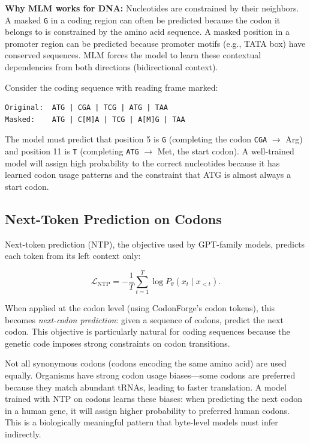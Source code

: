 \textbf{Why MLM works for DNA:} Nucleotides are constrained by their neighbors. A masked \texttt{G} in a coding region can often be predicted because the codon it belongs to is constrained by the amino acid sequence. A masked position in a promoter region can be predicted because promoter motifs (e.g., TATA box) have conserved sequences. MLM forces the model to learn these contextual dependencies from both directions (bidirectional context).

\begin{example}
Consider the coding sequence with reading frame marked:

\begin{verbatim}
Original:  ATG | CGA | TCG | ATG | TAA
Masked:    ATG | C[M]A | TCG | A[M]G | TAA
\end{verbatim}

\noindent
The model must predict that position 5 is \texttt{G} (completing the codon \texttt{CGA} $\to$ Arg) and position 11 is \texttt{T} (completing \texttt{ATG} $\to$ Met, the start codon). A well-trained model will assign high probability to the correct nucleotides because it has learned codon usage patterns and the constraint that ATG is almost always a start codon.
\end{example}

\subsection{Next-Token Prediction on Codons}

Next-token prediction (NTP), the objective used by GPT-family models, predicts each token from its left context only:

\begin{equation}
\mathcal{L}_{\mathrm{NTP}} = -\frac{1}{T} \sum_{t=1}^{T} \log P_\theta(x_t \mid x_{<t}).
\label{eq:ntp-codon}
\end{equation}

When applied at the codon level (using CodonForge's codon tokens), this becomes \emph{next-codon prediction}: given a sequence of codons, predict the next codon. This objective is particularly natural for coding sequences because the genetic code imposes strong constraints on codon transitions.

\begin{bioinsight}
Not all synonymous codons (codons encoding the same amino acid) are used equally. Organisms have strong codon usage biases---some codons are preferred because they match abundant tRNAs, leading to faster translation. A model trained with NTP on codons learns these biases: when predicting the next codon in a human gene, it will assign higher probability to preferred human codons. This is a biologically meaningful pattern that byte-level models must infer indirectly.
\end{bioinsight}

